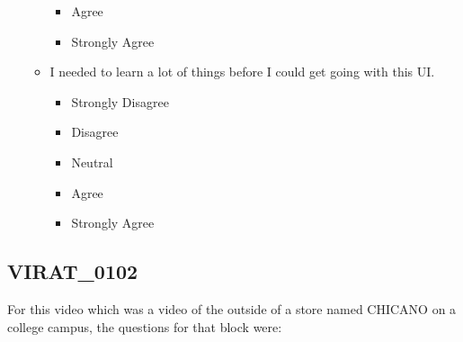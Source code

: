 \documentclass[doublespace,draft,nopageskip]{VTthesis} %
\begin{document}
\begin{itemize}
\begin{itemize}
\begin{itemize}
                \item Agree
                \item Strongly Agree
            \end{itemize}
        \item I needed to learn a lot of things before I could get going with this UI.
            \begin{itemize}
                \item Strongly Disagree
                \item Disagree
                \item Neutral
                \item Agree
                \item Strongly Agree
            \end{itemize}
    \end{itemize}
\end{itemize}

\subsection{VIRAT_0102}

For this video which was a video of the outside of a store named CHICANO on a college campus, the questions for that block were: 
\end{document}
